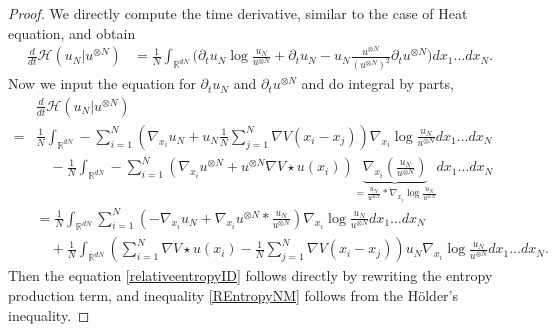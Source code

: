 \begin{proof}
We directly compute the time derivative, similar to the case of Heat equation, and obtain
\begin{align*}
  \frac{d}{dt} \mathcal{H}(u_N | u^{\otimes N}) &= \frac{1}{N} \int_{\mathbb{R}^{dN} } \Big(\partial_t u_N  \log \frac{u_N}{u^{\otimes N} }+ \partial_t u_N - u_N \frac{u^{\otimes N}}{(u^{\otimes N} )^2}\partial_t u^{\otimes N}\Big) dx_{1}\ldots dx_N.
\end{align*}
Now we input the equation for $\partial_t u_N$ and $\partial_t u^{\otimes N}$ and do integral by parts,
\begin{align*}
   &\frac{d}{dt} \mathcal{H}(u_N | u^{\otimes N}) \\
                       = & \frac{1}{N} \int_{\mathbb{R}^{dN} }- \sum_{i=1}^{N}(\nabla_{x_i} u_N + u_N \frac{1}{N} \sum_{j=1}^{N} \nabla V (x_i-x_j) ) \nabla_{x_i} \log \frac{u_N}{u^{\otimes N} } dx_{1}\ldots dx_N\\
                                                &\quad - \frac{1}{N} \int_{\mathbb{R}^{dN} }-  \sum_{i=1}^{N}(\nabla_{x_i} u^{\otimes N}  + u^{\otimes N} \nabla V \star u(x_i) ) \underbrace{\nabla_{x_i}(\frac{u_N}{u^{\otimes N} })}_{= \frac{u_N}{u^{\otimes N} }*\nabla_{x_i} \log \frac{u_N}{u^{\otimes N} }}dx_{1}\ldots dx_N\\
                                                &= \frac{1}{N} \int_{\mathbb{R}^{dN} } \sum_{i=1}^{N}(-\nabla_{x_i}u_N + \nabla_{x_i} u^{\otimes N}*\frac{u_N}{u^{\otimes N} } ) \nabla_{x_i} \log \frac{u_N}{u^{\otimes N} }dx_{1}\ldots dx_N\\
                                                &\quad + \frac{1}{N} \int_{\mathbb{R}^{dN} } \left(\sum_{i=1}^{N} \nabla V \star  u(x_i)  - \frac{1}{N} \sum_{j=1}^{N}  \nabla V(x_i - x_j) \right)u_N \nabla_{x_i} \log \frac{u_N}{u^{\otimes N} } dx_{1}\ldots dx_N
.\end{align*}
Then the equation \autoref{relativeentropyID} follows directly by rewriting the entropy production term, and inequality \autoref{REntropyNM} follows from the H\"older's inequality.
\end{proof}

